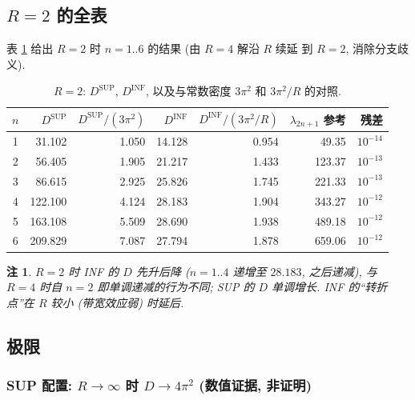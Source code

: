 \documentclass[UTF8]{ctexart}
\newtheorem{remark}[theorem]{注}
\begin{document}
\subsection{\texorpdfstring{$R=2$}{R=2} 的全表}

表 \ref{tab:r2} 给出 $R=2$ 时 $n=1..6$ 的结果 (由 $R=4$ 解沿 $R$ 续延
到 $R=2$, 消除分支歧义).

\begin{table}[ht]
\centering
\caption{$R=2$: $D^{\mathrm{SUP}}$, $D^{\mathrm{INF}}$, 以及与常数密度
$3\pi^2$ 和 $3\pi^2/R$ 的对照.}
\label{tab:r2}
\begin{tabular}{c|rrr|rrr}
	$n$ & $D^{\mathrm{SUP}}$ & $D^{\mathrm{SUP}}/(3\pi^2)$ &
	$D^{\mathrm{INF}}$ & $D^{\mathrm{INF}}/(3\pi^2/R)$ &
	$\lambda_{2n+1}$ 参考 & 残差 \\\hline
	1 & 31.102 & 1.050 & 14.128 & 0.954 & 49.35 & $10^{-14}$\\
	2 & 56.405 & 1.905 & 21.217 & 1.433 & 123.37 & $10^{-13}$\\
	3 & 86.615 & 2.925 & 25.826 & 1.745 & 221.33 & $10^{-13}$\\
	4 & 122.100 & 4.124 & 28.183 & 1.904 & 343.27 & $10^{-12}$\\
	5 & 163.108 & 5.509 & 28.690 & 1.938 & 489.18 & $10^{-12}$\\
	6 & 209.829 & 7.087 & 27.794 & 1.878 & 659.06 & $10^{-12}$\\
\end{tabular}
\end{table}

\begin{remark}
	$R=2$ 时 INF 的 $D$ 先升后降 ($n=1..4$ 递增至 $28.183$, 之后递减),
	与 $R=4$ 时自 $n=2$ 即单调递减的行为不同; SUP 的 $D$ 单调增长.
	INF 的``转折点''在 $R$ 较小 (带宽效应弱) 时延后.
\end{remark}

\subsection{极限}\label{sec:limit}

\subsubsection{SUP 配置: \texorpdfstring{$R \to \infty$}{R-inf} 时 \texorpdfstring{$D \to 4\pi^2$}{D-4pi2} (数值证据, 非证明)}
\end{document}
